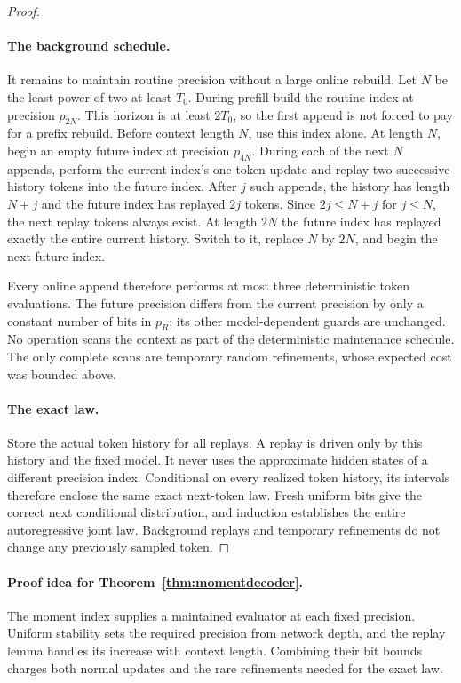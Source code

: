 \begin{proof}
\paragraph{The background schedule.}
It remains to maintain routine precision without a large online
rebuild.  Let $N$ be the least power of two at least $T_0$.
During prefill build the routine index at precision $p_{2N}$.
This horizon is at least $2T_0$, so the first append is not forced
to pay for a prefix rebuild.  Before context length $N$, use
this index alone.  At length $N$, begin an empty future index at
precision $p_{4N}$.  During each of the next $N$ appends, perform
the current index's one-token update and replay two successive
history tokens into the future index.  After $j$ such appends,
the history has length $N+j$ and the future index has replayed
$2j$ tokens.  Since $2j\le N+j$ for $j\le N$, the next replay
tokens always exist.  At length $2N$ the future index has replayed
exactly the entire current history.  Switch to it, replace $N$
by $2N$, and begin the next future index.

Every online append therefore performs at most three deterministic
token evaluations.  The future precision differs from the
current precision by only a constant number of bits in $p_R$;
its other model-dependent guards are unchanged.  No operation
scans the context as part of the deterministic maintenance
schedule.  The only complete scans are temporary random
refinements, whose expected cost was bounded above.

\paragraph{The exact law.}
Store the actual token history for all replays.  A replay is
driven only by this history and the fixed model.  It never uses
the approximate hidden states of a different precision index.
Conditional on every realized token history, its intervals
therefore enclose the same exact next-token law.  Fresh uniform
bits give the correct next conditional distribution, and induction
establishes the entire autoregressive joint law.  Background
replays and temporary refinements do not change any previously
sampled token.
\end{proof}

\paragraph{Proof idea for Theorem~\ref{thm:momentdecoder}.}
The moment index supplies a maintained evaluator at each fixed
precision.  Uniform stability sets the required precision from
network depth, and the replay lemma handles its increase with
context length.  Combining their bit bounds charges both normal
updates and the rare refinements needed for the exact law.

